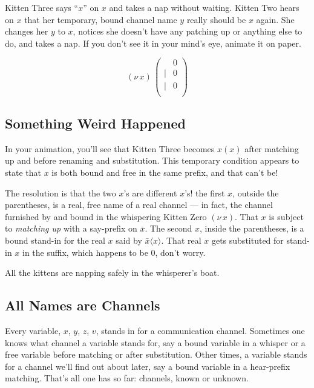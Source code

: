 \documentclass[10pt,oneside,x11names]{article}
\newcommand\napping    [0]{0}
\newcommand\whispering [2]{(\nu\,#1)\,{#2}}
\theoremstyle{definition}
\theoremstyle{warning}
\begin{document}
Kitten Three says ``\(x\)'' on \(x\) and takes a nap without
waiting. Kitten Two hears on \(x\) that her temporary, bound
channel name \(y\) really should be \(x\) again. She changes her
\(y\) to \(x\), notices she doesn't have any patching up or
anything else to do, and takes a nap. If you don't see it in
your mind's eye, animate it on paper.

\begin{equation}
\whispering{x}{\left(
\begin{array}{clll}
 {}     & \napping   \\
 \vert  & {\napping} \\
 \vert  & {\napping} \\
\end{array}\right)}
\end{equation}

\subsection{Something Weird Happened}
\label{sec:orgb21c30b}

In your animation, you'll see that Kitten Three becomes \(x(x)\)
after matching up and before renaming and substitution. This
temporary condition appears to state that \(x\) is both bound
and free in the same prefix, and that can't be!

The resolution is that the two \(x\)'s are different \(x\)'s! the
first \(x\), outside the parentheses, is a real, free name of a
real channel --- in fact, the channel furnished by and bound
in the whispering Kitten Zero \((\nu\,x)\). That \(x\) is subject
to \emph{matching up} with a say-prefix on \(\bar{x}\). The second
\(x\), inside the parentheses, is a bound stand-in for the real
\(x\) said by  \(\bar{x}\langle{x}\rangle\). That real \(x\) gets
substituted for stand-in \(x\) in the suffix, which happens to
be \(0\), don't worry.

All the kittens are napping safely in the whisperer's boat.

\subsection{All Names are Channels}
\label{sec:orgb73e377}

Every variable, \(x\), \(y\), \(z\), \(v\), stands in for a
communication channel. Sometimes one knows what channel a
variable stands for, say a bound variable in a whisper or a
free variable before matching or after substitution. Other
times, a variable stands for a channel we'll find out about
later, say a bound variable in a hear-prefix matching. That's
all one has so far: channels, known or unknown.
\end{document}
